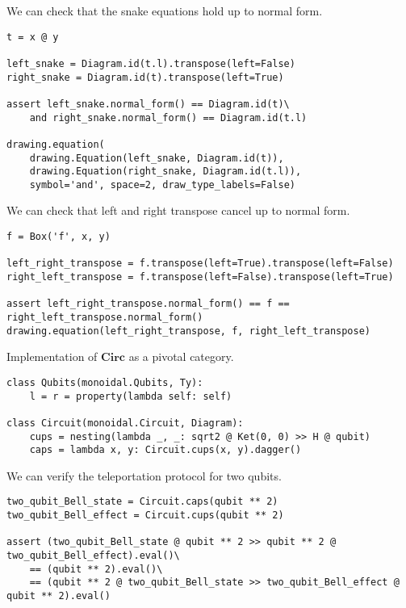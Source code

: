 \begin{example}
We can check that the snake equations hold up to normal form.

\begin{verbatim}
t = x @ y

left_snake = Diagram.id(t.l).transpose(left=False)
right_snake = Diagram.id(t).transpose(left=True)

assert left_snake.normal_form() == Diagram.id(t)\
    and right_snake.normal_form() == Diagram.id(t.l)

drawing.equation(
    drawing.Equation(left_snake, Diagram.id(t)),
    drawing.Equation(right_snake, Diagram.id(t.l)),
    symbol='and', space=2, draw_type_labels=False)
\end{verbatim}

\end{example}

\begin{example}
We can check that left and right transpose cancel up to normal form.

\begin{verbatim}
f = Box('f', x, y)

left_right_transpose = f.transpose(left=True).transpose(left=False)
right_left_transpose = f.transpose(left=False).transpose(left=True)

assert left_right_transpose.normal_form() == f == right_left_transpose.normal_form()
drawing.equation(left_right_transpose, f, right_left_transpose)
\end{verbatim}

\end{example}

\begin{python}\label{example:pivotal-circuit}
{\normalfont Implementation of $\mathbf{Circ}$ as a pivotal category.}

\begin{verbatim}
class Qubits(monoidal.Qubits, Ty):
    l = r = property(lambda self: self)

class Circuit(monoidal.Circuit, Diagram):
    cups = nesting(lambda _, _: sqrt2 @ Ket(0, 0) >> H @ qubit)
    caps = lambda x, y: Circuit.cups(x, y).dagger()
\end{verbatim}
\end{python}

\begin{example}
We can verify the teleportation protocol for two qubits.

\begin{verbatim}
two_qubit_Bell_state = Circuit.caps(qubit ** 2)
two_qubit_Bell_effect = Circuit.cups(qubit ** 2)

assert (two_qubit_Bell_state @ qubit ** 2 >> qubit ** 2 @ two_qubit_Bell_effect).eval()\
    == (qubit ** 2).eval()\
    == (qubit ** 2 @ two_qubit_Bell_state >> two_qubit_Bell_effect @ qubit ** 2).eval()
\end{verbatim}
\end{example}

